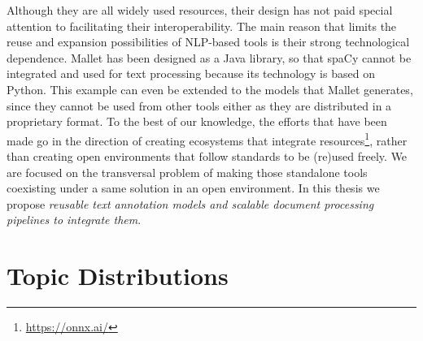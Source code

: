 Although they are all widely used resources, their design has not paid special attention to facilitating their interoperability. The main reason that limits the reuse and expansion possibilities of NLP-based tools is their strong technological dependence. Mallet has been designed as a Java library, so that spaCy cannot be integrated and used for text processing because its technology is based on Python. This example can even be extended to the models that Mallet generates, since they cannot be used from other tools either as they are distributed in a proprietary format. To the best of our knowledge, the efforts that have been made go in the direction of creating ecosystems that integrate resources\footnote{\url{https://onnx.ai/}}, rather than creating open environments that follow standards to be (re)used freely. We are focused on the transversal problem of making those standalone tools coexisting under a same solution in an open environment. In this thesis we propose \textit{reusable text annotation models and scalable document processing pipelines to integrate them}.  
 

\section{Topic Distributions}

